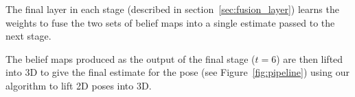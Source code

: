 \documentclass[10pt,twocolumn,letterpaper]{article}
\begin{document}
 The final layer in each stage (described in
section~\ref{sec:fusion_layer}) learns the weights to fuse the two sets of
belief maps into a single estimate passed to the next stage.

 The belief maps produced as the output of the
final stage ($t=6$) are then lifted into 3D to give the final estimate for the
pose (see Figure~\ref{fig:pipeline}) using our algorithm to lift 2D poses into
3D.






\end{document}
